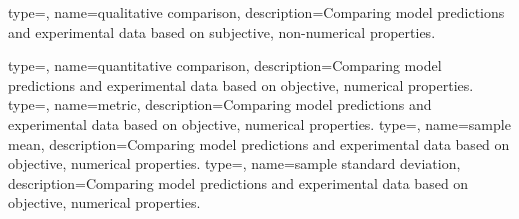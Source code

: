 {
type=\thisgls,
name={qualitative comparison},
description={Comparing model predictions and experimental data based on subjective, non-numerical properties.}
}

{
type=\thisgls,
name={quantitative comparison},
description={Comparing model predictions and experimental data based on objective, numerical properties.}
}
{
type=\thisgls,
name={metric},
description={Comparing model predictions and experimental data based on objective, numerical properties.}
}
{
type=\thisgls,
name={sample mean},
description={Comparing model predictions and experimental data based on objective, numerical properties.}
}
{
type=\thisgls,
name={sample standard deviation},
description={Comparing model predictions and experimental data based on objective, numerical properties.}
}


